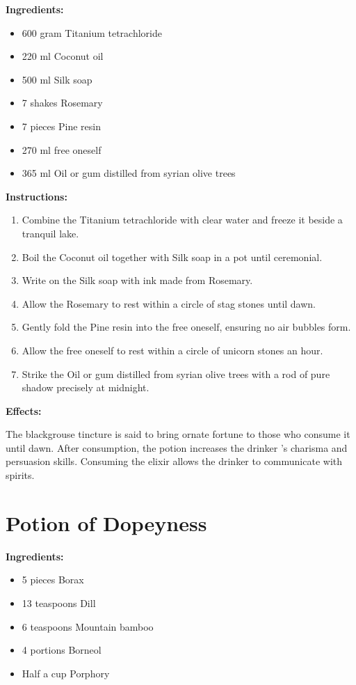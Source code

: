 \documentclass{article}
\begin{document}
\textbf{Ingredients:}

\begin{itemize}
  \item 600 gram Titanium tetrachloride
  \item 220 ml Coconut oil
  \item 500 ml Silk soap
  \item 7 shakes Rosemary
  \item 7 pieces Pine resin
  \item 270 ml free oneself
  \item 365 ml Oil or gum distilled from syrian olive trees
\end{itemize}

\textbf{Instructions:}

\begin{enumerate}
  \item Combine the Titanium tetrachloride with clear water and freeze it beside a tranquil lake.
  \item Boil the Coconut oil together with Silk soap in a pot until ceremonial.
  \item Write on the Silk soap with ink made from Rosemary.
  \item Allow the Rosemary to rest within a circle of stag stones until dawn.
  \item Gently fold the Pine resin into the free oneself, ensuring no air bubbles form.
  \item Allow the free oneself to rest within a circle of unicorn stones an hour.
  \item Strike the Oil or gum distilled from syrian olive trees with a rod of pure shadow precisely at midnight.
\end{enumerate}

\textbf{Effects:}

The blackgrouse tincture is said to bring ornate fortune to those who consume it until dawn. After consumption, the potion increases the drinker 's charisma and persuasion skills. Consuming the elixir allows the drinker to communicate with spirits.

\newpage
\section*{Potion of Dopeyness}

\textbf{Ingredients:}

\begin{itemize}
  \item 5 pieces Borax
  \item 13 teaspoons Dill
  \item 6 teaspoons Mountain bamboo
  \item 4 portions Borneol
  \item Half a cup Porphory
\end{itemize}
\end{document}
